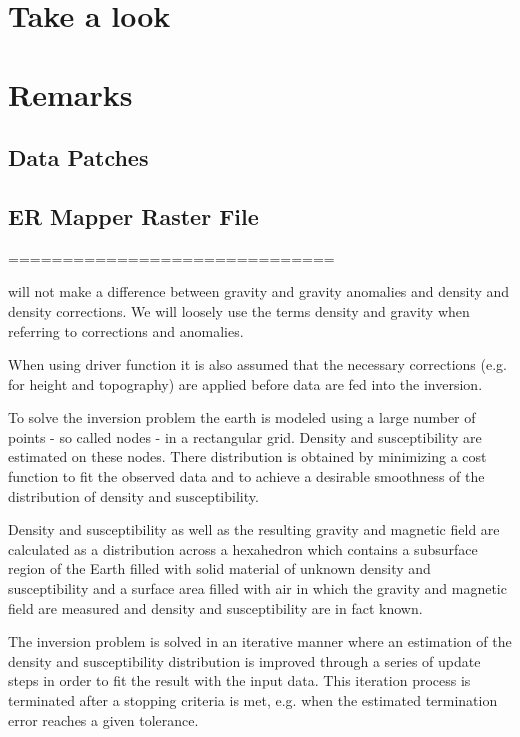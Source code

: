 \section{Take a look}

\section{Remarks}

\subsection{Data Patches}\label{SEC:P1:GRAV:REMARK:DATA2}

\subsection{ER Mapper Raster File}\label{SEC:P1:GRAV:REMARK:ERMAPPER}


  

==============================

will not make a difference between gravity and gravity anomalies 
and density and density corrections. We will loosely use the terms density and gravity when referring to corrections and anomalies.  

When using \downunder driver function it is also assumed that the necessary corrections (e.g. for height and topography) are applied 
before data are fed into the inversion. 
 
To solve the inversion problem 
the earth is modeled using a large number of points - so called nodes - in a rectangular grid.
Density and susceptibility are estimated on these nodes. 
There distribution is obtained by minimizing a cost function to fit the observed data and to achieve 
a desirable smoothness of the distribution of density and susceptibility. 

 

Density and susceptibility as well as the resulting gravity and magnetic field
are calculated as a distribution across a hexahedron which contains a subsurface region of the Earth filled
with solid material of unknown density and susceptibility and a surface area filled with air 
in which the gravity and magnetic field are measured and density and susceptibility are in fact known.

The inversion problem is solved in an iterative manner 
where an estimation of the density and susceptibility distribution
is improved through a series of update steps in order to fit the result with the input data. 
This iteration process is terminated after a stopping criteria is met, e.g. when the estimated 
termination error reaches a given tolerance.





